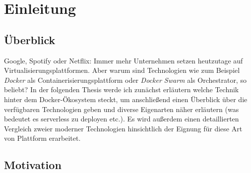 \chapter{Einleitung \checkmark}

\section{\"Uberblick \checkmark}

Google, Spotify oder Netflix: Immer mehr Unternehmen setzen heutzutage auf Virtualisierungsplattformen. Aber warum sind Technologien wie zum Beispiel \emph{Docker} als Containerisierungsplattform oder \emph{Docker Swarm} als Orchestrator, so beliebt? In der folgenden Thesis werde ich zunächst erläutern welche Technik hinter dem Docker-Ökosystem steckt, um anschließend einen Überblick über die verfügbaren Technologien geben und diverse Eigenarten näher erläutern (was bedeutet es serverless zu deployen etc.). Es wird außerdem einen detaillierten Vergleich zweier moderner Technologien hinsichtlich der Eignung für diese Art von Plattform erarbeitet.


\section{Motivation \checkmark}

